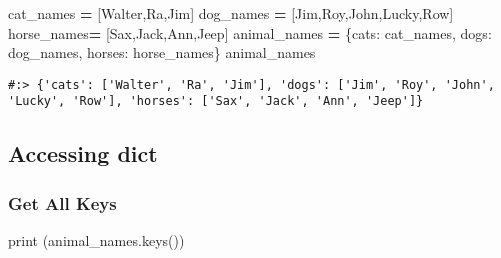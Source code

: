 \documentclass[
]{book}
\newenvironment{Shaded}{\begin{snugshade}}{\end{snugshade}}
\newcommand{\BuiltInTok}[1]{#1}
\newcommand{\NormalTok}[1]{#1}
\newcommand{\OperatorTok}[1]{\textcolor[rgb]{0.43,0.43,0.43}{\textbf{#1}}}
\newcommand{\StringTok}[1]{\textcolor[rgb]{0.5,0.5,0.5}{#1}}
\begin{document}
\begin{Shaded}
\begin{Highlighting}[]
\NormalTok{cat\_names }\OperatorTok{=}\NormalTok{ [}\StringTok{\textquotesingle{}Walter\textquotesingle{}}\NormalTok{,}\StringTok{\textquotesingle{}Ra\textquotesingle{}}\NormalTok{,}\StringTok{\textquotesingle{}Jim\textquotesingle{}}\NormalTok{]}
\NormalTok{dog\_names }\OperatorTok{=}\NormalTok{ [}\StringTok{\textquotesingle{}Jim\textquotesingle{}}\NormalTok{,}\StringTok{\textquotesingle{}Roy\textquotesingle{}}\NormalTok{,}\StringTok{\textquotesingle{}John\textquotesingle{}}\NormalTok{,}\StringTok{\textquotesingle{}Lucky\textquotesingle{}}\NormalTok{,}\StringTok{\textquotesingle{}Row\textquotesingle{}}\NormalTok{]}
\NormalTok{horse\_names}\OperatorTok{=}\NormalTok{ [}\StringTok{\textquotesingle{}Sax\textquotesingle{}}\NormalTok{,}\StringTok{\textquotesingle{}Jack\textquotesingle{}}\NormalTok{,}\StringTok{\textquotesingle{}Ann\textquotesingle{}}\NormalTok{,}\StringTok{\textquotesingle{}Jeep\textquotesingle{}}\NormalTok{]}
\NormalTok{animal\_names }\OperatorTok{=}\NormalTok{ \{}\StringTok{\textquotesingle{}cats\textquotesingle{}}\NormalTok{: cat\_names, }\StringTok{\textquotesingle{}dogs\textquotesingle{}}\NormalTok{: dog\_names, }\StringTok{\textquotesingle{}horses\textquotesingle{}}\NormalTok{: horse\_names\}}
\NormalTok{animal\_names}
\end{Highlighting}
\end{Shaded}

\begin{verbatim}
#:> {'cats': ['Walter', 'Ra', 'Jim'], 'dogs': ['Jim', 'Roy', 'John', 'Lucky', 'Row'], 'horses': ['Sax', 'Jack', 'Ann', 'Jeep']}
\end{verbatim}

\hypertarget{accessing-dict}{%
\subsection{Accessing dict}\label{accessing-dict}}

\hypertarget{get-all-keys}{%
\subsubsection{Get All Keys}\label{get-all-keys}}

\begin{Shaded}
\begin{Highlighting}[]
\BuiltInTok{print}\NormalTok{ (animal\_names.keys())}
\end{Highlighting}
\end{Shaded}
\end{document}
